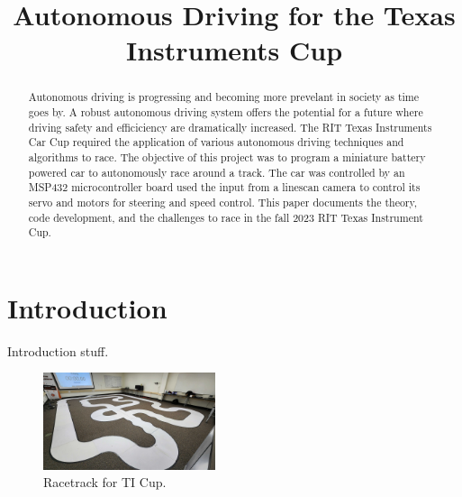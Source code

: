 \documentclass[conference]{IEEEtran}
\begin{document}
\title{Autonomous Driving for the Texas Instruments Cup}

\author{
\and
{}
}

\maketitle

\begin{abstract}
Autonomous driving is progressing and becoming more prevelant in society as time goes by. A robust autonomous driving system offers the potential for a future where driving safety and efficiciency are dramatically increased. The RIT Texas Instruments Car Cup required the application of various autonomous driving techniques and algorithms to race. The objective of this project was to program a miniature battery powered car to autonomously race around a track. The car was controlled by an MSP432 microcontroller board used the input from a linescan camera to control its servo and motors for steering and speed control. This paper documents the theory, code development, and the challenges to race in the fall 2023 RIT Texas Instrument Cup.
\end{abstract}

\section{Introduction}
Introduction stuff.

\begin{figure}[htbp]
	\centerline{\includegraphics[width=0.45\textwidth]{images/track.jpg}}
	\caption{Racetrack for TI Cup.}
	\label{fig}
\end{figure}
\end{document}
